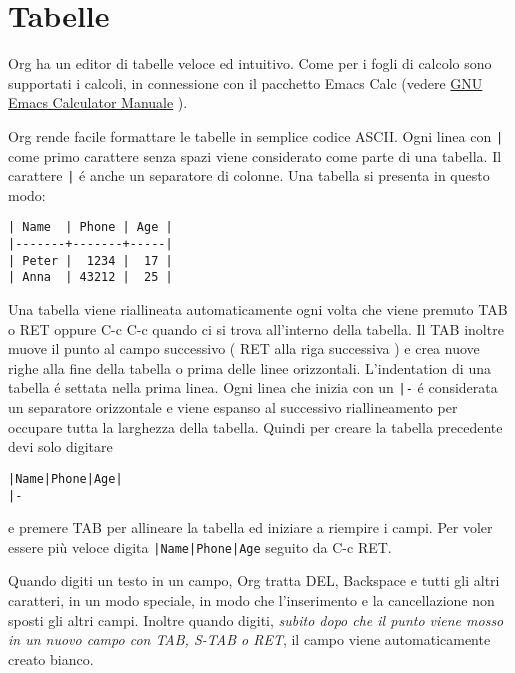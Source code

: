 \documentclass[11pt]{article}
\begin{document}
\section{Tabelle}
\label{sec:org039a4ee}
Org ha un editor di tabelle veloce ed intuitivo. Come per i fogli di
calcolo sono supportati i calcoli, in connessione con il pacchetto
Emacs Calc (vedere \href{https://www.gnu.org/software/emacs/manual/html\_mono/calc.html\#Top}{GNU Emacs Calculator Manuale} ).

Org rende facile formattare le tabelle in semplice codice ASCII. Ogni
linea con \texttt{|} come primo carattere senza spazi viene considerato come
parte di una tabella. Il carattere \texttt{|} é anche un separatore di
colonne. Una tabella si presenta in questo modo:

\begin{verbatim}
| Name  | Phone | Age |
|-------+-------+-----|
| Peter |  1234 |  17 |
| Anna  | 43212 |  25 |
\end{verbatim}

Una tabella viene riallineata automaticamente ogni volta che viene
premuto TAB o RET oppure C-c C-c
quando ci si trova all'interno della tabella. Il TAB
inoltre muove il punto al campo successivo ( RET alla riga
successiva ) e crea nuove righe alla fine della tabella o prima delle
linee orizzontali. L'indentation di una tabella é settata nella prima
linea. Ogni linea che inizia con un \texttt{|-} é considerata un separatore
orizzontale e viene espanso al successivo riallineamento per occupare
tutta la larghezza della tabella. Quindi per creare la tabella
precedente devi solo digitare

\begin{verbatim}
|Name|Phone|Age|
|-
\end{verbatim}


e premere TAB per allineare la tabella ed iniziare a
riempire i campi. Per voler essere più veloce digita \texttt{|Name|Phone|Age}
seguito da C-c RET.

Quando digiti un testo in un campo, Org tratta DEL,
Backspace e tutti gli altri caratteri, in un modo speciale,
in modo che l'inserimento e la cancellazione non sposti gli altri
campi. Inoltre quando digiti, \emph{subito dopo che il punto viene mosso in
un nuovo campo con TAB, S-TAB o RET},
il campo viene automaticamente creato bianco.
\end{document}
